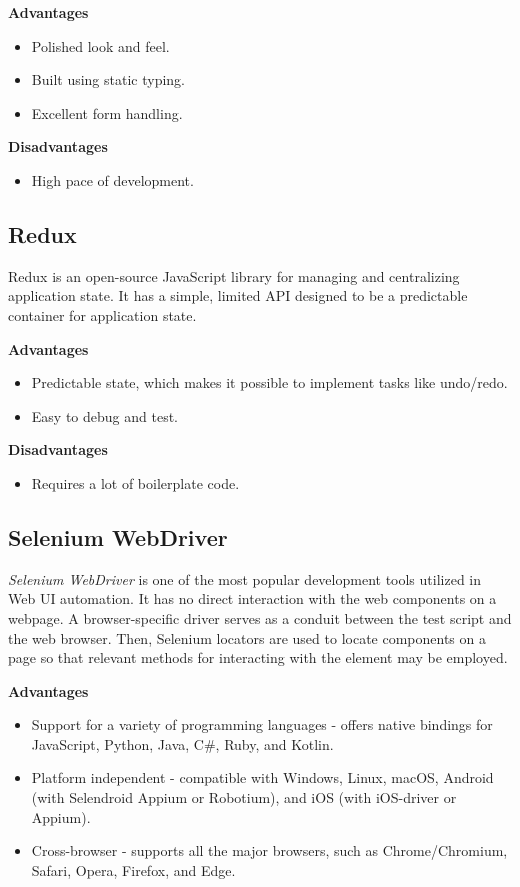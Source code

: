 \textbf{Advantages}
\begin{itemize}
    \item Polished look and feel.
    \item Built using static typing.
    \item Excellent form handling.
\end{itemize}
\textbf{Disadvantages}
\begin{itemize}
    \item High pace of development.
\end{itemize}

\subsection{Redux}
Redux \cite{redux} is an open-source JavaScript library for managing and centralizing application state. It has a simple, limited API designed to be a predictable container for application state.

\textbf{Advantages}
\begin{itemize}
    \item Predictable state, which makes it possible to implement tasks like undo/redo.
    \item Easy to debug and test.
\end{itemize}
\textbf{Disadvantages}
\begin{itemize}
    \item Requires a lot of boilerplate code.
\end{itemize}

\subsection{Selenium WebDriver} \label{subsec:selenium_webdriver}

\textit{Selenium WebDriver} \cite{selenium} is one of the most popular development tools utilized in Web UI automation. It has no direct interaction with the web components on a webpage. A browser-specific driver serves as a conduit between the test script and the web browser. Then, Selenium locators are used to locate components on a page so that relevant methods for interacting with the element may be employed.

\textbf{Advantages}
\begin{itemize}
    \item Support for a variety of programming languages - offers native bindings for JavaScript, Python, Java, C\#, Ruby, and Kotlin.
    \item Platform independent - compatible with Windows, Linux, macOS, Android (with Selendroid Appium or Robotium), and iOS (with iOS-driver or Appium).
    \item Cross-browser - supports all the major browsers, such as Chrome/Chromium, Safari, Opera, Firefox, and Edge.
\end{itemize}

